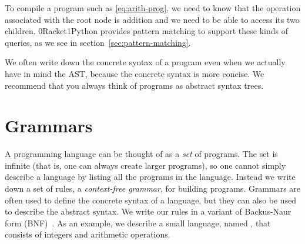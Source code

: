 \documentclass[7x10]{TimesAPriori_MIT}%
\def\racketEd{0}
\def\pythonEd{1}
\providecommand{\BookEdition}{1}
\let\edition\BookEdition
\newcommand{\racket}[1]{{\if\edition\racketEd{#1}\fi}}
\newcommand{\pythonColor}[0]{}
\newcommand{\python}[1]{{\if\edition\pythonEd\pythonColor #1\fi}}
\numberwithin{theorem}{chapter}
\numberwithin{definition}{chapter}
\numberwithin{equation}{chapter}
\begin{document}
To compile a program such as \eqref{eq:arith-prog}, we need to know
that the operation associated with the root node is addition and we
need to be able to access its two
children. \racket{Racket}\python{Python} provides pattern matching to
support these kinds of queries, as we see in
section~\ref{sec:pattern-matching}.

We often write down the concrete syntax of a program even when we
actually have in mind the AST, because the concrete syntax is more
concise.  We recommend that you always think of programs as abstract
syntax trees.

\section{Grammars}
\label{sec:grammar}

A programming language can be thought of as a \emph{set} of programs.
The set is infinite (that is, one can always create larger programs),
so one cannot simply describe a language by listing all the
programs in the language. Instead we write down a set of rules, a
\emph{context-free grammar}, for building programs. Grammars are often used to
define the concrete syntax of a language, but they can also be used to
describe the abstract syntax. We write our rules in a variant of
Backus-Naur form (BNF)~\citep{Backus:1960aa,Knuth:1964aa}.
 As an example,
we describe a small language, named \LangInt{}, that consists of
integers and arithmetic operations.
\end{document}
